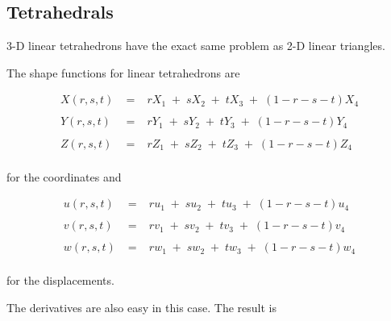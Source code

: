 \subsection{Tetrahedrals}
3-D linear tetrahedrons have the exact same problem as 2-D linear triangles.

The shape functions for linear tetrahedrons are

\begin{eqnarray*}
X(r,s,t) & \; = \; & r X_1 \; + \; s X_2 \; + \; t X_3 \; + \; (1 - r - s - t) X_4 \\
\\
Y(r,s,t) & \; = \; & r Y_1 \; + \; s Y_2 \; + \; t Y_3 \; + \; (1 - r - s - t) Y_4 \\
\\
Z(r,s,t) & \; = \; & r Z_1 \; + \; s Z_2 \; + \; t Z_3 \; + \; (1 - r - s - t) Z_4 \\
\end{eqnarray*}

for the coordinates and 

\begin{eqnarray*}
u(r,s,t) & \; = \; & r u_1 \; + \; s u_2 \; + \; t u_3 \; + \; (1 - r - s - t) u_4 \\
\\
v(r,s,t) & \; = \; & r v_1 \; + \; s v_2 \; + \; t v_3 \; + \; (1 - r - s - t) v_4 \\
\\
w(r,s,t) & \; = \; & r w_1 \; + \; s w_2 \; + \; t w_3 \; + \; (1 - r - s - t) w_4 \\
\end{eqnarray*}

for the displacements.

The derivatives are also easy in this case.  The result is

